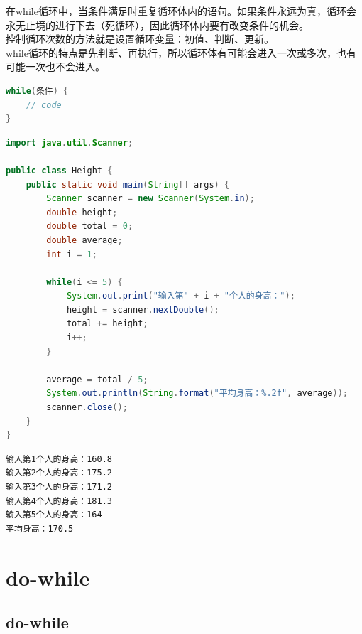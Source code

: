 在while循环中，当条件满足时重复循环体内的语句。如果条件永远为真，循环会永无止境的进行下去（死循环），因此循环体内要有改变条件的机会。\\

控制循环次数的方法就是设置循环变量：初值、判断、更新。\\

while循环的特点是先判断、再执行，所以循环体有可能会进入一次或多次，也有可能一次也不会进入。

\vspace{-0.5cm}

\begin{lstlisting}[language=Java]
while(条件) {
    // code
}
\end{lstlisting}

\vspace{0.5cm}


\begin{lstlisting}[language=Java]
import java.util.Scanner;

public class Height {
    public static void main(String[] args) {
        Scanner scanner = new Scanner(System.in);
        double height;
        double total = 0;
        double average;
        int i = 1;
        
        while(i <= 5) {
            System.out.print("输入第" + i + "个人的身高：");
            height = scanner.nextDouble();
            total += height;
            i++;
        }
        
        average = total / 5;
        System.out.println(String.format("平均身高：%.2f", average));
        scanner.close();
    }
}
\end{lstlisting}

\begin{tcolorbox}
    \begin{verbatim}
输入第1个人的身高：160.8
输入第2个人的身高：175.2
输入第3个人的身高：171.2
输入第4个人的身高：181.3
输入第5个人的身高：164
平均身高：170.5
\end{verbatim}
\end{tcolorbox}

\newpage

\section{do-while}

\subsection{do-while}

